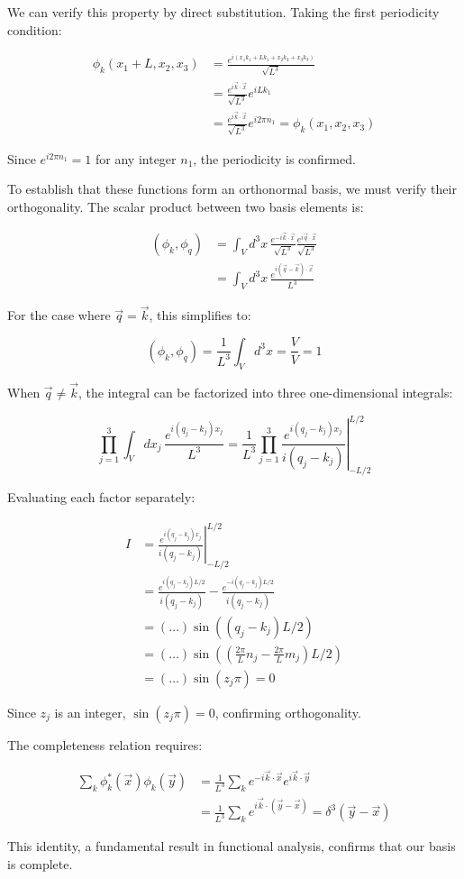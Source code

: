 We can verify this property by direct substitution. Taking the first periodicity condition:

\begin{align}
\phi_k(x_1+L, x_2, x_3) &= \frac{e^{i(x_1k_1+Lk_1+x_2k_2+x_3k_3)}}{\sqrt{L^3}} \\
&= \frac{e^{i\vec{k}\cdot\vec{x}}}{\sqrt{L^3}}e^{iLk_1} \\
&= \frac{e^{i\vec{k}\cdot\vec{x}}}{\sqrt{L^3}}e^{i2\pi n_1} = \phi_k(x_1, x_2, x_3)
\end{align}

Since $e^{i2\pi n_1} = 1$ for any integer $n_1$, the periodicity is confirmed.

To establish that these functions form an orthonormal basis, we must verify their orthogonality. The scalar product between two basis elements is:

\begin{align}
(\phi_k, \phi_q) &= \int_V d^3x\, \frac{e^{-i\vec{k}\cdot\vec{x}}}{\sqrt{L^3}} \frac{e^{i\vec{q}\cdot\vec{x}}}{\sqrt{L^3}} \\
&= \int_V d^3x\, \frac{e^{i(\vec{q}-\vec{k})\cdot\vec{x}}}{L^3}
\end{align}

For the case where $\vec{q} = \vec{k}$, this simplifies to:

\begin{equation}
(\phi_k, \phi_q) = \frac{1}{L^3}\int_V d^3x = \frac{V}{V} = 1
\end{equation}

When $\vec{q} \neq \vec{k}$, the integral can be factorized into three one-dimensional integrals:

\begin{equation}
\prod_{j=1}^3 \int_V dx_j\, \frac{e^{i(q_j-k_j)x_j}}{L^3} = \left.\frac{1}{L^3}\prod_{j=1}^3 \frac{e^{i(q_j-k_j)x_j}}{i(q_j-k_j)}\right|_{-L/2}^{L/2}
\end{equation}

Evaluating each factor separately:

\begin{align}
I &= \left.\frac{e^{i(q_j-k_j)x_j}}{i(q_j-k_j)}\right|_{-L/2}^{L/2} \\
&= \frac{e^{i(q_j-k_j)L/2}}{i(q_j-k_j)} - \frac{e^{-i(q_j-k_j)L/2}}{i(q_j-k_j)} \\
&= (\ldots)\sin((q_j-k_j)L/2)  \\
&= (\ldots)\sin((\frac{2\pi}{L}n_j-\frac{2\pi}{L}m_j)L/2) \\
&= (\ldots)\sin(z_j\pi) = 0
\end{align}

Since $z_j$ is an integer, $\sin(z_j\pi) = 0$, confirming orthogonality.

The completeness relation requires:

\begin{align}
\sum_k \phi_k^*(\vec{x})\phi_k(\vec{y}) &= \frac{1}{L^3}\sum_k e^{-i\vec{k}\cdot\vec{x}}e^{i\vec{k}\cdot\vec{y}} \\
&= \frac{1}{L^3}\sum_k e^{i\vec{k}\cdot(\vec{y}-\vec{x})} = \delta^3(\vec{y}-\vec{x})
\end{align}

This identity, a fundamental result in functional analysis, confirms that our basis is complete.
